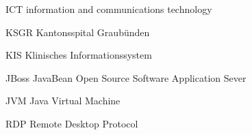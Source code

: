 
\begin{abkuerzungen}[MUSTER] %
    \item[ICT] information and communications technology
    \item[KSGR] Kantonsspital Graubünden
    \item[KIS] Klinisches Informationssystem
    \item[\gls{JBoss}] JavaBean Open Source Software Application Sever
    \item[JVM] \Gls{Java} Virtual Machine
    \item[RDP] Remote Desktop Protocol
\end{abkuerzungen}